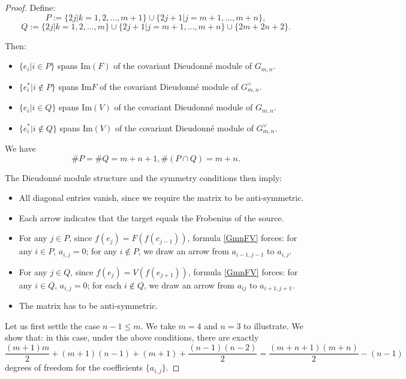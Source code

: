 \documentclass[a4paper,12pt,twoside]{report}
\newcommand{\IM}{\mathrm{Im}}
\begin{document}
\begin{proof}
    Define: \[P:= \{2j|k=1,2,...,m+1\}\cup \{2j+1|j=m+1,...,m+n\},\]
    \[Q:=\{2j|k=1,2,...,m\}\cup \{2j+1|j=m+1,...,m+n\}\cup \{2m+2n+2\}.\]

    Then: 
    \begin{itemize}
        \item $\{e_i|i\in P\}$ spans $\IM{(F)}$ of the covariant Dieudonné module of $G_{m,n}$. 
        \item $\{e_i^*|i \notin P\}$ spans $\IM{F}$ of the covariant Dieudonné module of $G_{m,n}^\vee$. 
        \item $\{e_i|i\in Q\}$ spans $\IM{(V)}$ of the covariant Dieudonné module of $G_{m,n}$. 
        \item $\{e_i^*|i \notin Q\}$ spans $\IM{(V)}$ of the covariant Dieudonné module of $G_{m,n}^\vee$. 
    \end{itemize}
    We have \[\#P=\#Q=m+n+1, \#(P\cap Q)=m+n.\]
   
The Dieudonné module structure and the symmetry conditions then imply:  
\begin{itemize}
    \item All diagonal entries vanish, since we require the matrix to be anti-symmetric. 
    \item Each arrow indicates that the target equals the Frobenius of the source.
    \item For any $j\in P$, since $f(e_j)=F(f(e_{j-1}))$, formula \ref{GmnFV} forces: for any $i\in P$, $a_{i,j}=0$; 
    for any $i \notin P$, we draw an arrow from $a_{i-1,j-1}$ to $a_{i,j}$. 
    \item For any $j\in Q$, since $f(e_j)=V(f(e_{j+1}))$, formula \ref{GmnFV} forces: for any $i\in Q$, $a_{i,j}=0$;
    for each $i\notin Q$, we draw an arrow from $a_{ij}$ to $a_{i+1,j+1}$. 
    \item The matrix has to be anti-symmetric. 
\end{itemize}

    Let us first settle the case $n-1\leqslant m$. 
    We take $m=4$ and $n=3$ to illustrate. 
    We show that: in this case, under the above conditions, there are exactly
    \[\frac{(m+1)m}{2}+(m+1)(n-1)+(m+1)+\frac{(n-1)(n-2)}{2}=\frac{(m+n+1)(m+n)}{2}-(n-1)\]
    degrees of freedom for the coefficients $\{a_{i,j}\}$.



\end{proof}
\end{document}
